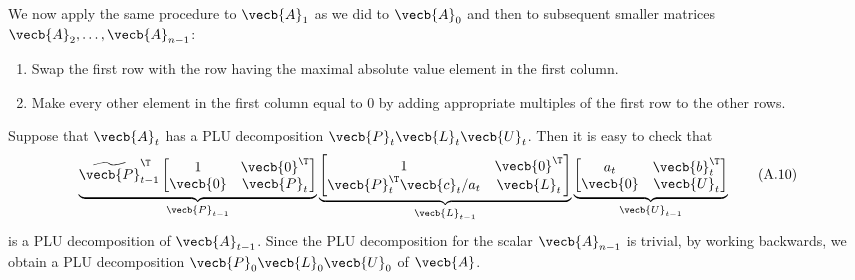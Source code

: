 We now apply the same procedure to $\vecb{A}_1$ as we did to $\vecb{A}_0$ and then to subsequent smaller matrices $\vecb{A}_2, \dots, \vecb{A}_{n-1}$:
\begin{enumerate}
	\item Swap the first row with the row having the maximal absolute value element in the first column.
	\item Make every other element in the first column equal to 0 by adding appropriate multiples of the first row to the other rows.
\end{enumerate}
Suppose that $\vecb{A}_t$ has a PLU decomposition $\vecb{P}_t \vecb{L}_t \vecb{U}_t$. Then it is easy to check that
\begin{equation}
	\underbrace{\widetilde{\vecb{P}}_{t-1}^\T
		\begin{bmatrix}
			1        & \vecb{0}^\T \\
			\vecb{0} & \vecb{P}_t
		\end{bmatrix}}_{\vecb{P}_{t-1}}
	\underbrace{
		\begin{bmatrix}
			1                              & \vecb{0}^\T \\
			\vecb{P}_t^\T \vecb{c}_t / a_t & \vecb{L}_t
		\end{bmatrix}}_{\vecb{L}_{t-1}}
	\underbrace{
		\begin{bmatrix}
			a_t      & \vecb{b}_t^\T \\
			\vecb{0} & \vecb{U}_t
		\end{bmatrix}}_{\vecb{U}_{t-1}} \tag{A.10}
\end{equation}
is a PLU decomposition of $\vecb{A}_{t-1}$. Since the PLU decomposition for the scalar $\vecb{A}_{n-1}$ is trivial, by working backwards, we obtain a PLU decomposition $\vecb{P}_0 \vecb{L}_0 \vecb{U}_0$ of $\vecb{A}$.

